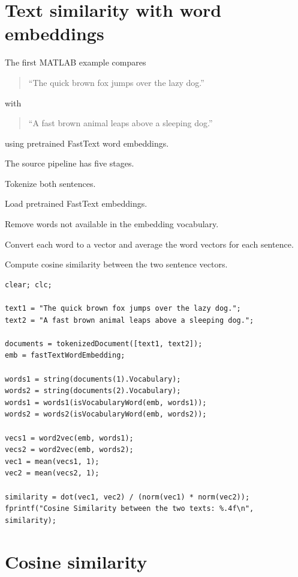 \section{Text similarity with word embeddings}

The first MATLAB example compares
\begin{quote}
``The quick brown fox jumps over the lazy dog.''
\end{quote}
with
\begin{quote}
``A fast brown animal leaps above a sleeping dog.''
\end{quote}
using pretrained FastText word embeddings.

The source pipeline has five stages.

\begin{mlsteps}
  \item Tokenize both sentences.
  \item Load pretrained FastText embeddings.
  \item Remove words not available in the embedding vocabulary.
  \item Convert each word to a vector and average the word vectors for each sentence.
  \item Compute cosine similarity between the two sentence vectors.
\end{mlsteps}

\begin{lstlisting}[style=mlmatlab]
clear; clc;

text1 = "The quick brown fox jumps over the lazy dog.";
text2 = "A fast brown animal leaps above a sleeping dog.";

documents = tokenizedDocument([text1, text2]);
emb = fastTextWordEmbedding;

words1 = string(documents(1).Vocabulary);
words2 = string(documents(2).Vocabulary);
words1 = words1(isVocabularyWord(emb, words1));
words2 = words2(isVocabularyWord(emb, words2));

vecs1 = word2vec(emb, words1);
vecs2 = word2vec(emb, words2);
vec1 = mean(vecs1, 1);
vec2 = mean(vecs2, 1);

similarity = dot(vec1, vec2) / (norm(vec1) * norm(vec2));
fprintf("Cosine Similarity between the two texts: %.4f\n", similarity);
\end{lstlisting}

\section{Cosine similarity}

